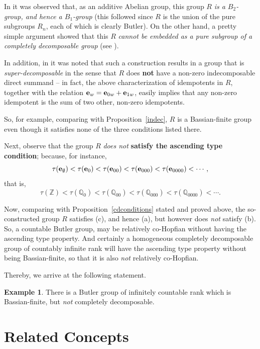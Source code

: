 \documentclass[12pt]{amsart}
\theoremstyle{definition}
\newtheorem{example}[theorem]{Example}
\def\bbv#1{{\bf #1}}
\def\Z{{\mathbb Z}}
\def\Q{{\mathbb Q}}
\begin{document}
In \cite{AR} it was observed that, as an additive Abelian group, this group $R$ {\it is a $B_2$-group, and hence a $B_1$-group} (this followed since $R$ is the union of the pure subgroups $R_n$, each of which is clearly Butler). On the other hand, a pretty simple argument showed that this $R$ {\it cannot be embedded as a pure subgroup of a completely decomposable group} (see \cite [Example~1]{AR}).

\medskip

In addition, in \cite[Theorem~14.9.3]{F} it was noted that such a construction results in a group that is {\it super-decomposable} in the sense that $R$ does {\bf not} have a non-zero indecomposable direct summand -- in fact, the above characterization of idempotents in $R$, together with the relation $\bbv e_w=\bbv e_{0w}+\bbv e_{1w}$, easily implies that any non-zero idempotent is the sum of two other, non-zero idempotents.

\medskip

So, for example, comparing with Proposition~\ref{indec}, $R$ is a Bassian-finite group even though it satisfies none of the three conditions listed there.

\medskip

Next, observe that the group $R$ {\it does not} {\bf satisfy the ascending type condition}; because, for instance,
$$\tau(\bbv e_\emptyset)<\tau(\bbv e_0)<\tau(\bbv e_{00})<\tau(\bbv e_{000})<\tau(\bbv e_{0000})<\cdots ,$$ that is,
$$\tau(\Z)<\tau(\Q_0)<\tau(\Q_{00})<\tau(\Q_{000})<\tau(\Q_{0000})<\cdots.$$

Now, comparing with Proposition~\ref{cdconditions} stated and proved above, the so-constructed group $R$ satisfies (c), and hence (a), but however does {\it not} satisfy (b). So, a countable Butler group, may be relatively co-Hopfian without having the ascending type property. And certainly a homogeneous completely decomposable group of countably infinite rank will have the ascending type property without being Bassian-finite, so that it is also {\it not} relatively co-Hopfian.

\medskip

Thereby, we arrive at the following statement.

\begin{example}\label{but} There is a Butler group of infinitely countable rank which is Bassian-finite, but {\it not} completely decomposable.
\end{example}

\section{Related Concepts}
\end{document}
